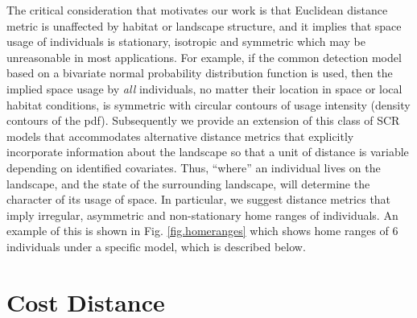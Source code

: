 \documentclass[12pt]{article}
\begin{document}
The critical consideration that motivates our work is that
 Euclidean distance metric is unaffected by habitat or landscape
structure, and it implies that space usage of individuals is
stationary, isotropic and symmetric which may be unreasonable in most
applications.  For example, if the common detection model based on a
bivariate
normal probability distribution function is used, then the implied
space
usage by {\it all} individuals, no matter their location in space or
local habitat conditions, is symmetric with circular contours of
usage intensity (density contours of the pdf).
Subsequently we provide an extension of this class of SCR models that
accommodates alternative distance metrics that explicitly incorporate
information about the landscape so that a unit of distance is variable
depending on identified covariates. Thus, ``where'' an individual
lives on the landscape, and the state of the surrounding landscape,
will determine the character of its usage of space. In particular, we
suggest distance metrics that imply irregular, asymmetric and
non-stationary home ranges of individuals. An example of this is shown
in Fig. \ref{fig.homeranges} which shows home ranges of 6 individuals under
a specific model, which is described below.


\section{Cost Distance}
\end{document}
